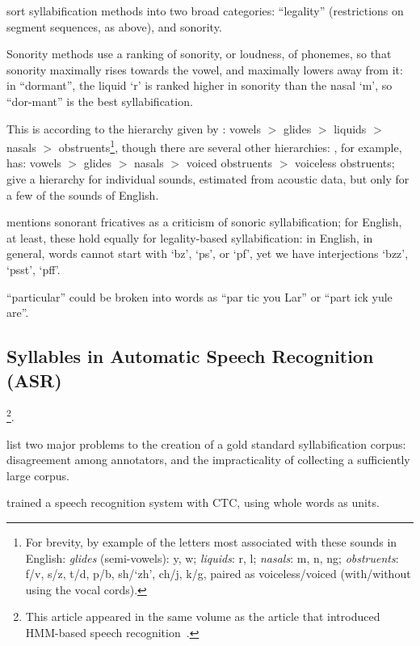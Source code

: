 \documentclass{article}[11pt]
\begin{document}
\citet{goslin_comparing_2007} sort syllabification methods into two broad categories: ``legality'' (restrictions on segment sequences, as above), and sonority.

Sonority methods use a ranking of sonority, or loudness, of phonemes, so that sonority maximally rises towards the vowel, and maximally lowers away from it: in ``dormant'', the liquid `r' is ranked higher in sonority than the nasal `m', so ``dor-mant'' is the best syllabification.

This is according to the hierarchy given by \citet{kingston_role_1990}: vowels $>$ glides $>$ liquids $>$ nasals $>$ obstruents\footnote{For brevity, by example of the letters most associated with these sounds in English: \textit{glides} (semi-vowels): y, w; \textit{liquids}: r, l; \textit{nasals}: m, n, ng; \textit{obstruents}: f/v, s/z, t/d, p/b, sh/`zh', ch/j, k/g, paired as voiceless/voiced (with/without using the vocal cords).}, though there are several other hierarchies: \citet{katamba_introduction_1989}, for example, has: vowels $>$ glides $>$ nasals $>$ voiced obstruents $>$ voiceless obstruents; \citet{ladefoged_course_2011} give a hierarchy for individual sounds, estimated from acoustic data, but only for a few of the sounds of English.

\citet{saussure_course_1959} mentions sonorant fricatives as a criticism of sonoric syllabification; for English, at least, these hold equally for legality-based syllabification: in English, in general, words cannot start with `bz', `ps', or `pf', yet we have interjections `bzz', `psst', `pff'.

``particular'' could be broken into words as ``par tic you Lar'' or ``part ick yule are''.

\subsection{Syllables in Automatic Speech Recognition (ASR)}
\label{ssect:syllasr}

\citep{fujimura_syllable_1975}\footnote{This article appeared in the same volume as the article that introduced HMM-based speech recognition~\citep{baker_dragon_1975}.}.

\citet{marchand_automatic_2009} list two major problems to the creation of a gold standard syllabification corpus: disagreement among annotators, and the impracticality of collecting a sufficiently large corpus.

\citet{soltau_neural_2017} trained a speech recognition system with CTC, using whole words as units.



%
\end{document}
